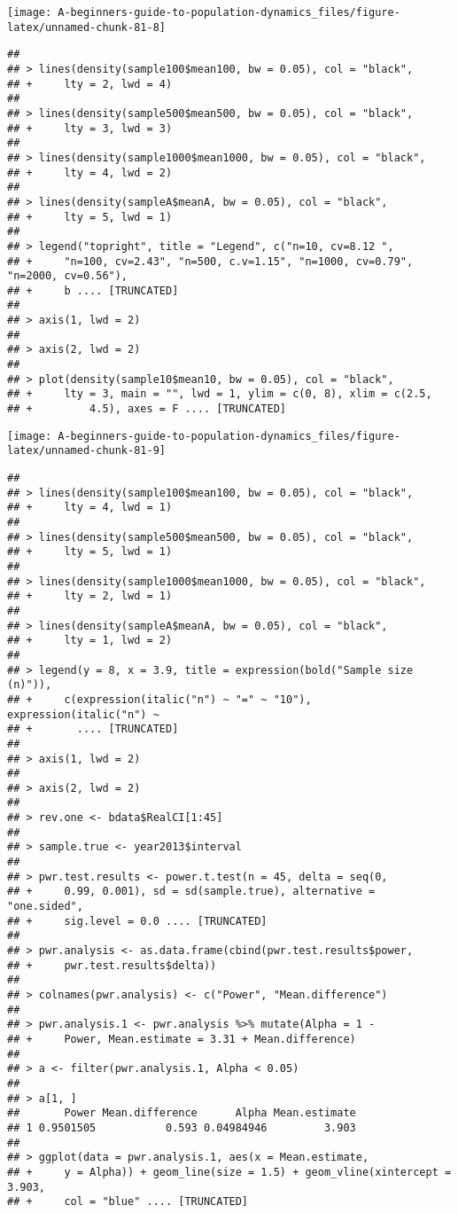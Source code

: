\documentclass[]{book}
\begin{document}
\begin{center}\texttt{[image: A-beginners-guide-to-population-dynamics\_files/figure-latex/unnamed-chunk-81-8]} \end{center}

\begin{verbatim}
## 
## > lines(density(sample100$mean100, bw = 0.05), col = "black", 
## +     lty = 2, lwd = 4)
## 
## > lines(density(sample500$mean500, bw = 0.05), col = "black", 
## +     lty = 3, lwd = 3)
## 
## > lines(density(sample1000$mean1000, bw = 0.05), col = "black", 
## +     lty = 4, lwd = 2)
## 
## > lines(density(sampleA$meanA, bw = 0.05), col = "black", 
## +     lty = 5, lwd = 1)
## 
## > legend("topright", title = "Legend", c("n=10, cv=8.12 ", 
## +     "n=100, cv=2.43", "n=500, c.v=1.15", "n=1000, cv=0.79", "n=2000, cv=0.56"), 
## +     b .... [TRUNCATED] 
## 
## > axis(1, lwd = 2)
## 
## > axis(2, lwd = 2)
## 
## > plot(density(sample10$mean10, bw = 0.05), col = "black", 
## +     lty = 3, main = "", lwd = 1, ylim = c(0, 8), xlim = c(2.5, 
## +         4.5), axes = F .... [TRUNCATED]
\end{verbatim}

\begin{center}\texttt{[image: A-beginners-guide-to-population-dynamics\_files/figure-latex/unnamed-chunk-81-9]} \end{center}

\begin{verbatim}
## 
## > lines(density(sample100$mean100, bw = 0.05), col = "black", 
## +     lty = 4, lwd = 1)
## 
## > lines(density(sample500$mean500, bw = 0.05), col = "black", 
## +     lty = 5, lwd = 1)
## 
## > lines(density(sample1000$mean1000, bw = 0.05), col = "black", 
## +     lty = 2, lwd = 1)
## 
## > lines(density(sampleA$meanA, bw = 0.05), col = "black", 
## +     lty = 1, lwd = 2)
## 
## > legend(y = 8, x = 3.9, title = expression(bold("Sample size (n)")), 
## +     c(expression(italic("n") ~ "=" ~ "10"), expression(italic("n") ~ 
## +       .... [TRUNCATED] 
## 
## > axis(1, lwd = 2)
## 
## > axis(2, lwd = 2)
## 
## > rev.one <- bdata$RealCI[1:45]
## 
## > sample.true <- year2013$interval
## 
## > pwr.test.results <- power.t.test(n = 45, delta = seq(0, 
## +     0.99, 0.001), sd = sd(sample.true), alternative = "one.sided", 
## +     sig.level = 0.0 .... [TRUNCATED] 
## 
## > pwr.analysis <- as.data.frame(cbind(pwr.test.results$power, 
## +     pwr.test.results$delta))
## 
## > colnames(pwr.analysis) <- c("Power", "Mean.difference")
## 
## > pwr.analysis.1 <- pwr.analysis %>% mutate(Alpha = 1 - 
## +     Power, Mean.estimate = 3.31 + Mean.difference)
## 
## > a <- filter(pwr.analysis.1, Alpha < 0.05)
## 
## > a[1, ]
##       Power Mean.difference      Alpha Mean.estimate
## 1 0.9501505           0.593 0.04984946         3.903
## 
## > ggplot(data = pwr.analysis.1, aes(x = Mean.estimate, 
## +     y = Alpha)) + geom_line(size = 1.5) + geom_vline(xintercept = 3.903, 
## +     col = "blue" .... [TRUNCATED]
\end{verbatim}
\end{document}
